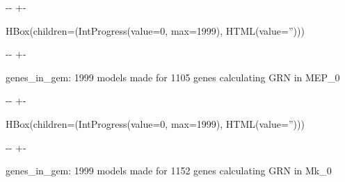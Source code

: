 \documentclass[letterpaper,10pt,english]{sphinxmanual}
\newlength\nbsphinxcodecellspacing
\begin{document}
{

\kern-\sphinxverbatimsmallskipamount\kern-\baselineskip
\kern+\FrameHeightAdjust\kern-\fboxrule
\vspace{\nbsphinxcodecellspacing}

\begin{sphinxVerbatim}[commandchars=\\\{\}]
HBox(children=(IntProgress(value=0, max=1999), HTML(value='')))
\end{sphinxVerbatim}
}

{

\kern-\sphinxverbatimsmallskipamount\kern-\baselineskip
\kern+\FrameHeightAdjust\kern-\fboxrule
\vspace{\nbsphinxcodecellspacing}

\begin{sphinxVerbatim}[commandchars=\\\{\}]

genes\_in\_gem: 1999
models made for 1105 genes
calculating GRN in MEP\_0
\end{sphinxVerbatim}
}

{

\kern-\sphinxverbatimsmallskipamount\kern-\baselineskip
\kern+\FrameHeightAdjust\kern-\fboxrule
\vspace{\nbsphinxcodecellspacing}

\begin{sphinxVerbatim}[commandchars=\\\{\}]
HBox(children=(IntProgress(value=0, max=1999), HTML(value='')))
\end{sphinxVerbatim}
}

{

\kern-\sphinxverbatimsmallskipamount\kern-\baselineskip
\kern+\FrameHeightAdjust\kern-\fboxrule
\vspace{\nbsphinxcodecellspacing}

\begin{sphinxVerbatim}[commandchars=\\\{\}]

genes\_in\_gem: 1999
models made for 1152 genes
calculating GRN in Mk\_0
\end{sphinxVerbatim}
}
\end{document}
